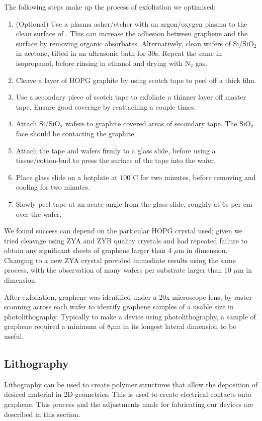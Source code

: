 \documentclass[../../Matt_Gebert_Honours_Thesis.tex]{subfiles}
\begin{document}
	The following steps make up the process of exfoliation we optimised:
	\begin{enumerate}
		\itemsep 0em
		\item (Optional) Use a plasma asher/etcher with an argon/oxygen plasma to the clean surface of \silicondioxide. This can increase the adhesion between graphene and the surface by removing organic absorbates\cite{huang_reliable_2015}. Alternatively, clean wafers of Si/SiO$_2$ in acetone, tilted in an ultrasonic bath for 30s. Repeat the same in isopropanol, before rinsing in ethanol and drying with N$_2$ gas.
		\item Cleave a layer of HOPG graphite by using scotch tape to peel off a thick film.
		\item Use a secondary piece of scotch tape to exfoliate a thinner layer off master tape. Ensure good coverage by reattaching a couple times. 
		\item Attach Si/SiO$_2$ wafers to graphite covered areas of secondary tape. The SiO$_2$ face should be contacting the graphite.
		\item Attach the tape and wafers firmly to a glass slide, before using a tissue/cotton-bud to press the surface of the tape into the wafer.
		\item Place glass slide on a hotplate at $100^\circ$C for two minutes, before removing and cooling for two minutes.
		\item Slowly peel tape at an acute angle from the glass slide, roughly at 6s per cm over the wafer.
	\end{enumerate}
	
	We found success can depend on the particular HOPG crystal used; given we tried cleavage using ZYA and ZYB quality crystals and had repeated failure to obtain any significant sheets of graphene larger than 4 $\mu$m in dimension. Changing to a new ZYA crystal provided immediate results using the same process, with the observation of many wafers per substrate larger than $10$ $\mu$m in dimension.
	
	After exfoliation, graphene was identified under a 20x microscope lens, by raster scanning across each wafer to identify graphene samples of a usable size in photolithography. Typically to make a device using photolithography, a sample of graphene required a minimum of 8$\mu$m in its longest lateral dimension to be useful.
	
	\subsection{Lithography}\label{sec:lithography}
	Lithography can be used to create polymer structures that allow the deposition of desired material in 2D geometries. This is used to create electrical contacts onto graphene. This process and the adjustments made for fabricating our devices are described in this section.\newline
	
\end{document}
